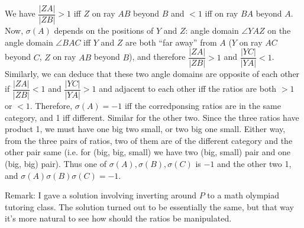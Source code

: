 \documentclass[11pt,a4paper]{article}
\begin{document}
\begin{enumerate}
	We have $\dfrac{|ZA|}{|ZB|}>1$ iff $Z$ on ray $AB$ beyond $B$ and $<1$ iff on ray $BA$ beyond $A$. 
	Now, $\sigma(A)$ depends on the positions of $Y$ and $Z$: angle domain $\angle YAZ$ on the angle domain $\angle BAC$ iff $Y$ and $Z$ are both ``far away'' from $A$ ($Y$ on ray $AC$ beyond $C$, $Z$ on ray $AB$ beyond $B$), and therefore $\dfrac{|ZA|}{|ZB|}>1$ and $\dfrac{|YC|}{|YA|}<1$. 
	Similarly, we can deduce that these two angle domains are opposite of each other if $\dfrac{|ZA|}{|ZB|}<1$ and $\dfrac{|YC|}{|YA|}>1$ and adjacent to each other iff the ratios are both $>1$ or $<1$.
	Therefore, $\sigma(A)=-1$ iff the corredponsing ratios are in the same category, and 1 iff different. Similar for the other two. Since the three ratios have product 1, we must have one big two small, or two big one small. Either way, from the three pairs of ratios, two of them are of the different category and the other pair same (i.e. for (big, big, small) we have two (big, small) pair and one (big, big) pair). 
	Thus one of $\sigma(A), \sigma(B), \sigma(C)$ is $-1$ and the other two 1, and $\sigma(A)\sigma(B)\sigma(C)=-1$. 
	
	Remark: I gave a solution involving inverting around $P$ to a math olympiad tutoring class. The solution turned out to be essentially the same, but that way it's more natural to see how should the ratios be manipulated. 
	
\end{enumerate}
\end{document}

